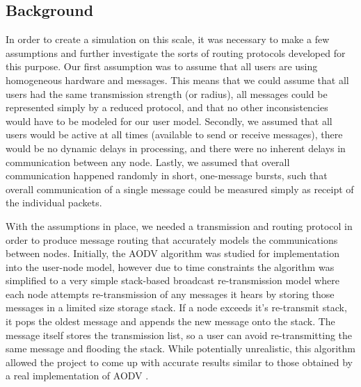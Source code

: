 \subsection{Background}
In order to create a simulation on this scale, it was necessary to make a few assumptions
and further investigate the sorts of routing protocols developed for this purpose.
Our first assumption was to assume that all users are using homogeneous hardware and messages.
This means that we could assume that all users had the same transmission strength (or radius),
all messages could be represented simply by a reduced protocol, and that no other inconsistencies
would have to be modeled for our user model.
Secondly, we assumed that all users would be active at all times (available to send or receive
messages), there would be no dynamic delays in processing, and there were no inherent delays in
communication between any node.
Lastly, we assumed that overall communication happened randomly in short, one-message bursts,
such that overall communication of a single message could be measured simply as receipt of the
individual packets.

With the assumptions in place, we needed a transmission and routing protocol in order to produce
message routing that accurately models the communications between nodes.
Initially, the AODV algorithm \cite{perkins99,royer00} was studied for implementation into the
user-node model, however due to time constraints the algorithm was simplified to a very simple
stack-based broadcast re-transmission model where each node attempts re-transmission of any
messages it hears by storing those messages in a limited size storage stack.
If a node exceeds it's re-transmit stack, it pops the oldest message and appends the new message 
onto the stack.
The message itself stores the transmission list, so a user can avoid re-transmitting the same
message and flooding the stack.
While potentially unrealistic, this algorithm allowed the project to come up with accurate
results similar to those obtained by a real implementation of AODV \cite{morshed08}.
